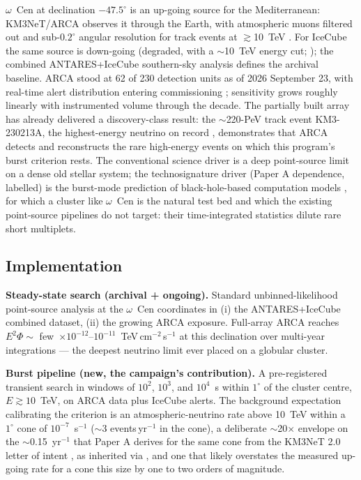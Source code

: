 \documentclass[11pt]{article}
\newcommand{\ocen}{\ensuremath{\omega}~Cen}
\begin{document}
\ocen{} at declination $-47.5^{\circ}$ is an up-going source for the Mediterranean: KM3NeT/ARCA observes it through the Earth, with atmospheric muons filtered out and sub-$0.2^{\circ}$ angular resolution for track events at $\gtrsim$10~TeV \citep{AdrianMartinez2016}. For IceCube the same source is down-going (degraded, with a $\sim$10~TeV energy cut; \citealt{IceCubePS2020}); the combined ANTARES+IceCube southern-sky analysis \citep{AntaresIceCube2020} defines the archival baseline. ARCA stood at 62 of 230 detection units as of 2026 September 23, with real-time alert distribution entering commissioning \citep{KM3NeTstatus2026}; sensitivity grows roughly linearly with instrumented volume through the decade. The partially built array has already delivered a discovery-class result: the $\sim$220-PeV track event KM3-230213A, the highest-energy neutrino on record \citep{KM3NeT2025}, demonstrates that ARCA detects and reconstructs the rare high-energy events on which this program's burst criterion rests. The conventional science driver is a deep point-source limit on a dense old stellar system; the technosignature driver (Paper A dependence, labelled) is the burst-mode prediction of black-hole-based computation models \citep{Dvali2023,Lacki2025}, for which a cluster like \ocen{} is the natural test bed and which the existing point-source pipelines do not target: their time-integrated statistics dilute rare short multiplets.

\subsection{Implementation}

\textbf{Steady-state search (archival + ongoing).} Standard unbinned-likelihood point-source analysis \citep{Braun2008} at the \ocen{} coordinates in (i) the ANTARES+IceCube combined dataset, (ii) the growing ARCA exposure. Full-array ARCA reaches $E^{2}\Phi \sim$ few~$\times10^{-12}$--$10^{-11}$~TeV\,cm$^{-2}$\,s$^{-1}$ at this declination over multi-year integrations --- the deepest neutrino limit ever placed on a globular cluster.

\textbf{Burst pipeline (new, the campaign's contribution).} A pre-registered transient search in windows of $10^{2}$, $10^{3}$, and $10^{4}$~s within $1^{\circ}$ of the cluster centre, $E \gtrsim 10$~TeV, on ARCA data plus IceCube alerts. The background expectation calibrating the criterion is an atmospheric-neutrino rate above 10~TeV within a $1^{\circ}$ cone of $10^{-7}$~s$^{-1}$ ($\sim$3 events\,yr$^{-1}$ in the cone), a deliberate $\sim$20$\times$ envelope on the $\sim$0.15~yr$^{-1}$ that Paper A derives for the same cone from the KM3NeT 2.0 letter of intent \citep{AdrianMartinez2016}, as inherited via \citealt{Swanson2026MTH}, and one that likely overstates the measured up-going rate for a cone this size by one to two orders of magnitude.
\end{document}
